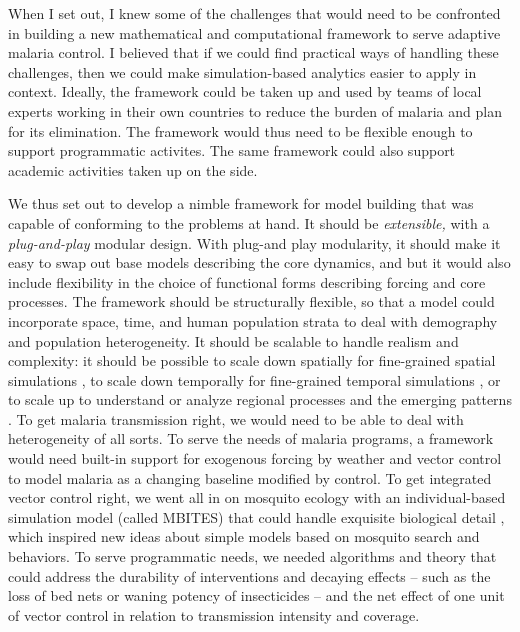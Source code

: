 \documentclass[
]{book}
\begin{document}
When I set out, I knew some of the challenges that would need to be confronted in building a new mathematical and computational framework to serve adaptive malaria control.
I believed that if we could find practical ways of handling these challenges, then we could make simulation-based analytics easier to apply in context.
Ideally, the framework could be taken up and used by teams of local experts working in their own countries to reduce the burden of malaria and plan for its elimination.
The framework would thus need to be flexible enough to support programmatic activites.
The same framework could also support academic activities taken up on the side.

We thus set out to develop a nimble framework for model building that was capable of conforming to the problems at hand. It should be \emph{extensible,} with a \emph{plug-and-play } modular design.
With plug-and play modularity, it should make it easy to swap out base models describing the core dynamics, and but it would also include flexibility in the choice of functional forms describing forcing and core processes.
The framework should be structurally flexible, so that a model could incorporate space, time, and human population strata to deal with demography and population heterogeneity.
It should be scalable to handle realism and complexity: it should be possible to scale down spatially for fine-grained spatial simulations \autocite{CarterR2002SpatialSimulation,GuW2003IndividualbasedModel,PerkinsTA2013HeterogeneityMixing}, to scale down temporally for fine-grained temporal simulations \autocite{WuSL2020MBITES}, or to scale up to understand or analyze regional processes and the emerging patterns \autocite{TatemAJ2010InternationalPopulation}.
To get malaria transmission right, we would need to be able to deal with heterogeneity of all sorts.
To serve the needs of malaria programs, a framework would need built-in support for exogenous forcing by weather and vector control to model malaria as a changing baseline modified by control.
To get integrated vector control right, we went all in on mosquito ecology with an individual-based simulation model (called MBITES) that could handle exquisite biological detail \autocite{WuSL2020MBITES}, which inspired new ideas about simple models based on mosquito search and behaviors.
To serve programmatic needs, we needed algorithms and theory that could address the durability of interventions and decaying effects -- such as the loss of bed nets or waning potency of insecticides --
and the net effect of one unit of vector control in relation to transmission intensity and coverage.
\end{document}
